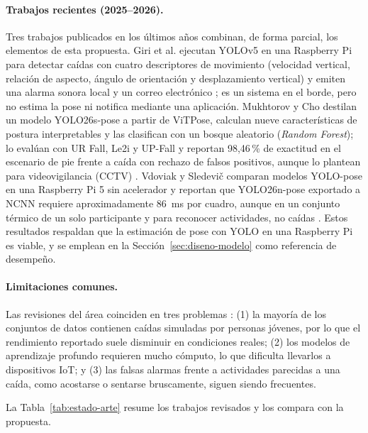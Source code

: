 \documentclass[12pt,a4paper,oneside]{book}
\theoremstyle{plain}
\theoremstyle{definition}
\theoremstyle{remark}
\begin{document}
\paragraph{Trabajos recientes (2025--2026).} Tres trabajos publicados en los últimos años combinan, de forma parcial, los elementos de esta propuesta. Giri et al. ejecutan YOLOv5 en una Raspberry Pi para detectar caídas con cuatro descriptores de movimiento (velocidad vertical, relación de aspecto, ángulo de orientación y desplazamiento vertical) y emiten una alarma sonora local y un correo electrónico \parencite{giri2025yolov5pi}; es un sistema en el borde, pero no estima la pose ni notifica mediante una aplicación. Mukhtorov y Cho destilan un modelo YOLO26s-pose a partir de ViTPose, calculan nueve características de postura interpretables y las clasifican con un bosque aleatorio (\textit{Random Forest}); lo evalúan con UR Fall, Le2i y UP-Fall y reportan 98,46\,\% de exactitud en el escenario de pie frente a caída con rechazo de falsos positivos, aunque lo plantean para videovigilancia (CCTV) \parencite{mukhtorov2026distilled}. Vdoviak y Sledevič comparan modelos YOLO-pose en una Raspberry Pi 5 sin acelerador y reportan que YOLO26n-pose exportado a NCNN requiere aproximadamente 86~ms por cuadro, aunque en un conjunto térmico de un solo participante y para reconocer actividades, no caídas \parencite{vdoviak2026thermal}. Estos resultados respaldan que la estimación de pose con YOLO en una Raspberry Pi es viable, y se emplean en la Sección~\ref{sec:diseno-modelo} como referencia de desempeño.

\paragraph{Limitaciones comunes.} Las revisiones del área coinciden en tres problemas \parencite{igual2013challenges,alam2022review}: (1) la mayoría de los conjuntos de datos contienen caídas simuladas por personas jóvenes, por lo que el rendimiento reportado suele disminuir en condiciones reales; (2) los modelos de aprendizaje profundo requieren mucho cómputo, lo que dificulta llevarlos a dispositivos IoT; y (3) las falsas alarmas frente a actividades parecidas a una caída, como acostarse o sentarse bruscamente, siguen siendo frecuentes.

La Tabla~\ref{tab:estado-arte} resume los trabajos revisados y los compara con la propuesta.
\end{document}
